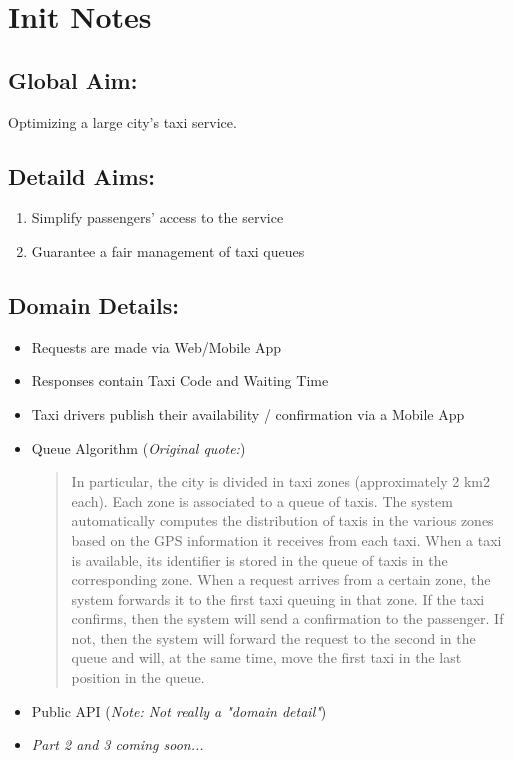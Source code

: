 \section{Init Notes}

\subsection{Global Aim:} Optimizing a large city's taxi service.

\subsection{Detaild Aims:} \begin{enumerate}
\item Simplify passengers' access to the service
\item Guarantee a fair management of taxi queues
\end{enumerate}

\subsection{Domain Details:} \begin{itemize}
\item Requests are made via Web/Mobile App
\item Responses contain Taxi Code and Waiting Time 
\item Taxi drivers publish their availability / confirmation via a Mobile App
\item Queue Algorithm (\textit{Original quote:}) 
\begin{quote}
In	particular,	the	city	is	
divided	in	 taxi	 zones	 (approximately	 2	 km2 each).	 Each	 zone	is	associated	 to	a	
queue	of	taxis.	The	system	automatically	computes	the	distribution	of	taxis	in	the	
various	zones	based	on	 the	GPS	information	it	receives	 from	each	 taxi.	When	a	
taxi	is	available,	its	identifier	is	stored	in	the	queue	of	taxis	in	the	corresponding	
zone.		
When	a	 request	arrives	 from	a	certain	zone,	 the	system	 forwards	it	 to	 the	 first	
taxi	 queuing	 in	 that	 zone.	 If	 the	 taxi	 confirms,	 then	 the	 system	 will	 send	 a	
confirmation	to	the	passenger.	If	not,	then	the	system	will	forward	the	request	to	
the	second	in	the	queue	and	will,	at	the	same	time,	move	the	first	taxi	in	the	last	
position	in	the	queue.
\end{quote}
\item Public API (\textit{Note: Not really a "domain detail"})
\item \textit{Part 2 and 3 coming soon...}
\end{itemize}


